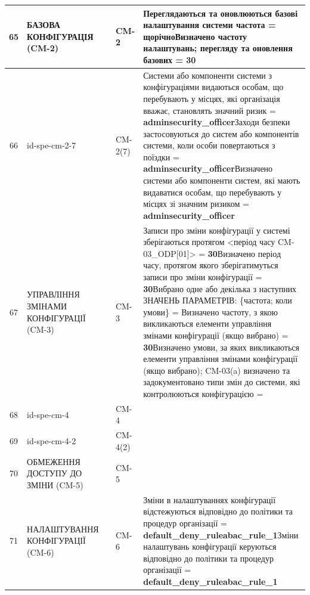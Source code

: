 \documentclass[10pt]{article}
\begin{document}
\begin{longtable}{|c|>{\raggedright\arraybackslash}p{4cm}|>{\raggedright\arraybackslash}p{2.5cm}|>{\raggedright\arraybackslash}p{3.5cm}|>{\raggedright\arraybackslash}p{5.5cm}|}
65 & БАЗОВА КОНФІГУРАЦІЯ (CM-2) &  & CM-2 & Переглядаються та оновлюються базові налаштування системи частота = \textbf{щорічно}\newline Визначено частоту налаштувань; перегляду та оновлення базових = \textbf{30} \\ \hline
66 & id-spe-cm-2-7 &  & CM-2(7) & Системи або компоненти системи з конфігураціями видаються особам, що перебувають у місцях, які організація вважає, становлять значний ризик = \textbf{adminsecurity\_\allowbreak{}officer}\newline Заходи безпеки застосовуються до систем або компонентів системи, коли особи повертаються з поїздки = \textbf{adminsecurity\_\allowbreak{}officer}\newline Визначено системи або компоненти систем, які мають видаватися особам, що перебувають у місцях зі значним ризиком = \textbf{adminsecurity\_\allowbreak{}officer} \\ \hline
67 & УПРАВЛІННЯ ЗМІНАМИ КОНФІГУРАЦІЇ (CM-3) &  & CM-3 & Записи про зміни конфігурації у системі зберігаються протягом <період часу CM-03\_\allowbreak{}ODP[01]> = \textbf{30}\newline Визначено період часу, протягом якого зберігатимуться записи про зміни конфігурації = \textbf{30}\newline Вибрано одне або декілька з наступних ЗНАЧЕНЬ ПАРАМЕТРІВ: \{частота; коли умови\} = \textbf{}\newline Визначено частоту, з якою викликаються елементи управління змінами конфігурації (якщо вибрано) = \textbf{30}\newline Визначено умови, за яких викликаються елементи управління змінами конфігурації (якщо вибрано); CM-03(a) визначено та задокументовано типи змін до системи, які контролюються конфігурацією = \textbf{} \\ \hline
68 & id-spe-cm-4 &  & CM-4 &  \\ \hline
69 & id-spe-cm-4-2 &  & CM-4(2) &  \\ \hline
70 & ОБМЕЖЕННЯ ДОСТУПУ ДО ЗМІНИ (CM-5) &  & CM-5 &  \\ \hline
71 & НАЛАШТУВАННЯ КОНФІГУРАЦІЇ (CM-6) &  & CM-6 & Зміни в налаштуваннях конфігурації відстежуються відповідно до політики та процедур організації = \textbf{default\_\allowbreak{}deny\_\allowbreak{}ruleabac\_\allowbreak{}rule\_\allowbreak{}1}\newline Зміни налаштувань конфігурації керуються відповідно до політики та процедур організації = \textbf{default\_\allowbreak{}deny\_\allowbreak{}ruleabac\_\allowbreak{}rule\_\allowbreak{}1} \\ \hline

\end{longtable}
\end{document}
